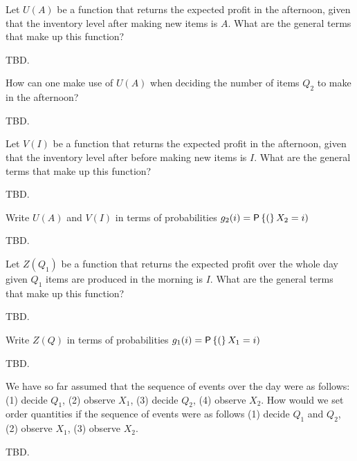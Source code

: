 \begin{question}
Let $U(A)$ be a function that returns the expected profit in the afternoon, given that the inventory level after making new items is $A$. What are the general terms that make up this function?
   \begin{solution}
     TBD.
   \end{solution}
\end{question}

\begin{question}
How can one make use of $U(A)$ when deciding the number of items $Q_2$ to make in the afternoon?
   \begin{solution}
     TBD.
   \end{solution}
\end{question}

\begin{question}
Let $V(I)$ be a function that returns the expected profit in the afternoon, given that the inventory level after before making new items is $I$. What are the general terms that make up this function?
   \begin{solution}
     TBD.
   \end{solution}
\end{question}

\begin{question}
Write $U(A)$ and $V(I)$ in terms of probabilities $g_2(i)=\P(X_2=i)$
   \begin{solution}
     TBD.
   \end{solution}
\end{question}

\begin{question}
Let $Z(Q_1)$ be a function that returns the expected profit over the whole day given $Q_1$ items are produced in the morning is $I$. What are the general terms that make up this function?
   \begin{solution}
     TBD.
   \end{solution}
\end{question}

\begin{question}
Write $Z(Q)$ in terms of probabilities $g_1(i)=\P(X_1=i)$
   \begin{solution}
     TBD.
   \end{solution}
\end{question}

\begin{question}
We have so far assumed that the sequence of events over the day were as follows: (1) decide $Q_1$, (2) observe $X_1$, (3) decide $Q_2$, (4) observe $X_2$. How would we set order quantities if the sequence of events were as follows (1) decide $Q_1$ and $Q_2$, (2) observe $X_1$, (3) observe $X_2$.
   \begin{solution}
     TBD.
   \end{solution}
\end{question}

